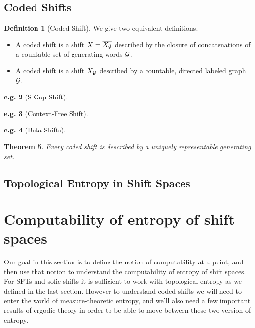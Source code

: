 \documentclass[11pt, reqno]{amsart}
\theoremstyle{plain}
\newtheorem{thm}{Theorem}[section]
\numberwithin{thm}{subsection}
\theoremstyle{definition}
\newtheorem{defn}[thm]{Definition}
\newtheorem{example}[thm]{e.g.}
\begin{document}
\subsection{Coded Shifts}
\begin{defn}[Coded Shift]\cite[L.8]{wolf}
  We give two equivalent definitions. 
  \begin{itemize}
    \item A coded shift is a shift $X = \overline{X_{\mathcal{G}}}$ described by the closure of concatenations of a countable set of generating words $\mathcal{G}$.
    \item A coded shift is a shift $X_{\mathcal{G}}$ described by a countable, directed labeled graph $\mathcal{G}$. 
  \end{itemize}
\end{defn}

\begin{example}[S-Gap Shift]\cite[L.8]{wolf}
  
\end{example}

\begin{example}[Context-Free Shift]\cite[L.4]{wolf}
  
\end{example}

\begin{example}[Beta Shifts]\cite[L.8, L.9]{wolf}
  
\end{example}

\begin{thm}\cite[L.8]{wolf}
  Every coded shift is described by a uniquely representable generating set.
\end{thm}

\subsection{Topological Entropy in Shift Spaces}\cite[L5]{wolf}



\newpage

\section{Computability of entropy of shift spaces}

Our goal in this section is to define the notion of computability at a point, and then use that notion to understand the computability of entropy of shift spaces. For SFTs and sofic shifts it is sufficient to work with topological entropy as we defined in the last section. However to understand coded shifts we will need to enter the world of measure-theoretic entropy, and we'll also need a few important results of ergodic theory in order to be able to move between these two version of entropy.
\end{document}
